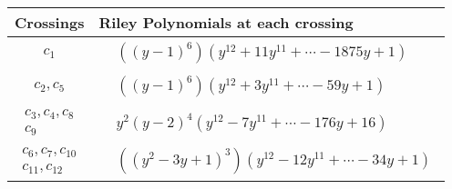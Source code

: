 \documentclass[1p]{elsarticle_modified}
\theoremstyle{definition}
\begin{document}
\begin{tabular}{m{50pt}|m{274pt}}
Crossings & \hspace{64pt}Riley Polynomials at each crossing \\
\hline $$\begin{aligned}c_{1}\end{aligned}$$&$\begin{aligned}
&((y-1)^6)(y^{12}+11 y^{11}+\cdots-1875 y+1)
\end{aligned}$\\
\hline $$\begin{aligned}c_{2},c_{5}\end{aligned}$$&$\begin{aligned}
&((y-1)^6)(y^{12}+3 y^{11}+\cdots-59 y+1)
\end{aligned}$\\
\hline $$\begin{aligned}c_{3},c_{4},c_{8}\\c_{9}\end{aligned}$$&$\begin{aligned}
&y^2(y-2)^4(y^{12}-7 y^{11}+\cdots-176 y+16)
\end{aligned}$\\
\hline $$\begin{aligned}c_{6},c_{7},c_{10}\\c_{11},c_{12}\end{aligned}$$&$\begin{aligned}
&((y^2-3 y+1)^3)(y^{12}-12 y^{11}+\cdots-34 y+1)
\end{aligned}$\\
\hline
\end{tabular}
\vskip 2pc
\end{document}
